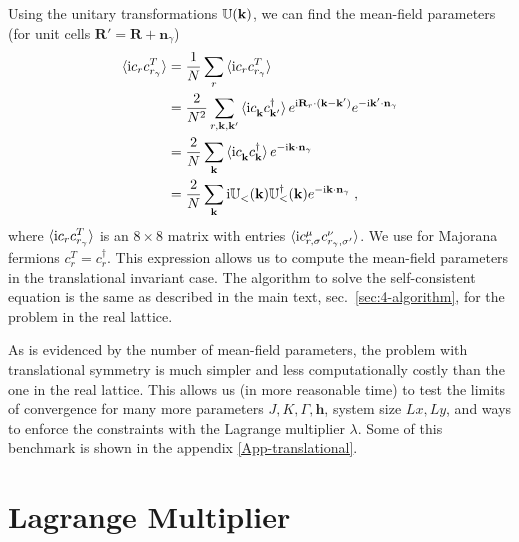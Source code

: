 Using the unitary transformations $\mathbb{U}(\mathbf{k})$, we can find the mean-field parameters (for unit cells $\mathbf{R}'=\mathbf{R}+\mathbf{n}_\gamma$)
\begin{align}
    \braket{ \im c_{r} c_{r_\gamma }^{T} }
    &= \frac{1}{N}\sum_r \braket{ \im c_{r} c_{r_\gamma }^{T} } \\
    &= \frac{2}{N^2}\sum_{r,\mathbf{k},\mathbf{k}'} \braket{ \im c_{\mathbf{k}}^\pd  c_{\mathbf{k}' }^\dagger } e^{\im \mathbf{R}_{r}\cdot(\mathbf{k}-\mathbf{k}')} e^{-\im \mathbf{k}'\cdot \mathbf{n}_\gamma}  \\
    &= \frac{2}{N}\sum_{\mathbf{k} } \braket{ \im c_{\mathbf{k}}^\pd  c_{\mathbf{k} }^\dagger } e^{-\im \mathbf{k} \cdot \mathbf{n}_\gamma}  \\
    &= \frac{2}{N}\sum_{\mathbf{k} } \im \mathbb{U}_{<}^\pd(\mathbf{k}) \mathbb{U}_{<}^\dagger(\mathbf{k})  e^{-\im \mathbf{k} \cdot \mathbf{n}_\gamma}   \; ,
\end{align}
where $\braket{ \mathrm{i} c_{r} c_{r_\gamma }^{T} }$ is an $8\times8$ matrix with entries $\braket{ \mathrm{i} c_{r,\sigma}^\mu  c_{r_\gamma,\sigma' }^\nu}$.
We use for Majorana fermions $c_r^T=c_r^\dagger$.
This expression allows us to compute the mean-field parameters in the translational invariant case.
The algorithm to solve the self-consistent equation is the same as described in the main text, sec.~\ref{sec:4-algorithm}, for the problem in the real lattice.

As is evidenced by the number of mean-field parameters, the problem with translational symmetry is much simpler and less computationally costly than the one in the real lattice.
This allows us (in more reasonable time) to test the limits of convergence for many more parameters $J, K, \Gamma, \bm{h}$, system size $Lx,Ly$, and ways to enforce the constraints with the Lagrange multiplier $\lambda$. Some of this benchmark is shown in the appendix \ref{App-translational}.










\section{Lagrange Multiplier}

